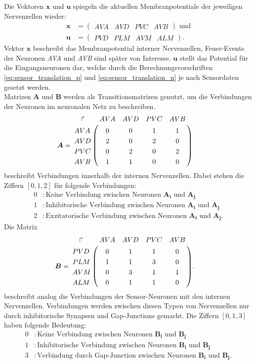 	Die Vektoren $\boldsymbol{x}$ und $\boldsymbol{u}$ spiegeln die aktuellen Membranpotentiale der jeweiligen Nervenzellen wieder:
	\begin{align}
		\boldsymbol{x} &= \begin{pmatrix}AVA & AVD & PVC & AVB\end{pmatrix}\text{ und}\\
		\boldsymbol{u} &= \begin{pmatrix}PVD & PLM & AVM & ALM\end{pmatrix}\text{.}
		\label{eq:xu}
	\end{align}
	Vektor $\boldsymbol{x}$ beschreibt das Membranpotential interner Nervenzellen, Feuer-Events der Neuronen \textit{AVA} und \textit{AVB} sind später von Interesse. $\boldsymbol{u}$ stellt das Potential für die Eingangsneuronen dar, welche durch die Berechnungsvorschriften \ref{eq:sensor_translation_p} und \ref{eq:sensor_translation_n} je nach Sensordaten gesetzt werden.\\
	Matrizen $\boldsymbol{A}$ und $\boldsymbol{B}$ werden als Transitionsmatrizen genutzt, um die Verbindungen der Neuronen im neuronalen Netz zu beschreiben.
	\begin{align}
		\boldsymbol{A} &= \bordermatrix{
		\quad\Rsh& AVA & AVD & PVC & AVB \cr
			AVA &  0  &  0  &  1  &  1  \cr
			AVD &  2  &  0  &  2  &  0  \cr
			PVC &  0  &  2  &  0  &  2  \cr
			AVB &  1  &  1  &  0  &  0  \cr
		}
	\end{align}
	beschreibt Verbindungen innerhalb der internen Nervenzellen. Dabei stehen die Ziffern $[0,1,2]$ für folgende Verbindungen:
	\begin{align*}
		0 &: \text{Keine Verbindung zwischen Neuronen }\boldsymbol{A_i}\text{ und } \boldsymbol{A_j}\\
		1 &: \text{Inhibitorische Verbindung zwischen Neuronen }\boldsymbol{A_i}\text{ und }\boldsymbol{A_j}\\
		2 &: \text{Exzitatorische Verbindung zwischen Neuronen }\boldsymbol{A_i}\text{ und }\boldsymbol{A_j}.
	\end{align*}
	Die Matrix
	\begin{align}
	\boldsymbol{B} &= \bordermatrix{
		\quad\Rsh& AVA & AVD & PVC & AVB \cr
			PVD &  0  &  1  &  1  &  0  \cr
			PLM &  1  &  1  &  3  &  0  \cr
			AVM &  0  &  3  &  1  &  1  \cr
			ALM &  0  &  1  &  1  &  0  \cr
		}\text{.}
	\end{align}
	beschreibt analog die Verbindungen der Sensor-Neuronen mit den internen Nervenzellen. Verbindungen werden zwischen diesen Typen von Nervenzellen nur durch inhibitorische Synapsen und Gap-Junctions gemacht. Die Ziffern $[0,1,3]$ haben folgende Bedeutung:
	\begin{align*}
		0 &: \text{Keine Verbindung zwischen Neuronen }\boldsymbol{B_i}\text{ und } \boldsymbol{B_j}\\
		1 &: \text{Inhibitorische Verbindung zwischen Neuronen }\boldsymbol{B_i}\text{ und }\boldsymbol{B_j}\\
		3 &: \text{Verbindung durch Gap-Junction zwischen Neuronen }\boldsymbol{B_i}\text{ und }\boldsymbol{B_j}.
	\end{align*}

